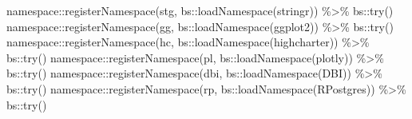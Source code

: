 \documentclass[
]{article}
\newenvironment{Shaded}{\begin{snugshade}}{\end{snugshade}}
\newcommand{\FunctionTok}[1]{\textcolor[rgb]{0.00,0.00,0.00}{#1}}
\newcommand{\NormalTok}[1]{#1}
\newcommand{\SpecialCharTok}[1]{\textcolor[rgb]{0.00,0.00,0.00}{#1}}
\newcommand{\StringTok}[1]{\textcolor[rgb]{0.31,0.60,0.02}{#1}}
\begin{document}
\begin{Shaded}
\begin{Highlighting}[]
\NormalTok{namespace}\SpecialCharTok{::}\FunctionTok{registerNamespace}\NormalTok{(}\StringTok{\textquotesingle{}stg\textquotesingle{}}\NormalTok{, bs}\SpecialCharTok{::}\FunctionTok{loadNamespace}\NormalTok{(}\StringTok{\textquotesingle{}stringr\textquotesingle{}}\NormalTok{)) }\SpecialCharTok{\%\textgreater{}\%}\NormalTok{ bs}\SpecialCharTok{::}\FunctionTok{try}\NormalTok{()}
\NormalTok{namespace}\SpecialCharTok{::}\FunctionTok{registerNamespace}\NormalTok{(}\StringTok{\textquotesingle{}gg\textquotesingle{}}\NormalTok{, bs}\SpecialCharTok{::}\FunctionTok{loadNamespace}\NormalTok{(}\StringTok{\textquotesingle{}ggplot2\textquotesingle{}}\NormalTok{)) }\SpecialCharTok{\%\textgreater{}\%}\NormalTok{ bs}\SpecialCharTok{::}\FunctionTok{try}\NormalTok{()}
\NormalTok{namespace}\SpecialCharTok{::}\FunctionTok{registerNamespace}\NormalTok{(}\StringTok{\textquotesingle{}hc\textquotesingle{}}\NormalTok{, bs}\SpecialCharTok{::}\FunctionTok{loadNamespace}\NormalTok{(}\StringTok{\textquotesingle{}highcharter\textquotesingle{}}\NormalTok{)) }\SpecialCharTok{\%\textgreater{}\%}\NormalTok{ bs}\SpecialCharTok{::}\FunctionTok{try}\NormalTok{()}
\NormalTok{namespace}\SpecialCharTok{::}\FunctionTok{registerNamespace}\NormalTok{(}\StringTok{\textquotesingle{}pl\textquotesingle{}}\NormalTok{, bs}\SpecialCharTok{::}\FunctionTok{loadNamespace}\NormalTok{(}\StringTok{\textquotesingle{}plotly\textquotesingle{}}\NormalTok{)) }\SpecialCharTok{\%\textgreater{}\%}\NormalTok{ bs}\SpecialCharTok{::}\FunctionTok{try}\NormalTok{()}
\NormalTok{namespace}\SpecialCharTok{::}\FunctionTok{registerNamespace}\NormalTok{(}\StringTok{\textquotesingle{}dbi\textquotesingle{}}\NormalTok{, bs}\SpecialCharTok{::}\FunctionTok{loadNamespace}\NormalTok{(}\StringTok{\textquotesingle{}DBI\textquotesingle{}}\NormalTok{)) }\SpecialCharTok{\%\textgreater{}\%}\NormalTok{ bs}\SpecialCharTok{::}\FunctionTok{try}\NormalTok{()}
\NormalTok{namespace}\SpecialCharTok{::}\FunctionTok{registerNamespace}\NormalTok{(}\StringTok{\textquotesingle{}rp\textquotesingle{}}\NormalTok{, bs}\SpecialCharTok{::}\FunctionTok{loadNamespace}\NormalTok{(}\StringTok{\textquotesingle{}RPostgres\textquotesingle{}}\NormalTok{)) }\SpecialCharTok{\%\textgreater{}\%}\NormalTok{ bs}\SpecialCharTok{::}\FunctionTok{try}\NormalTok{()}


\end{Highlighting}
\end{Shaded}
\end{document}
